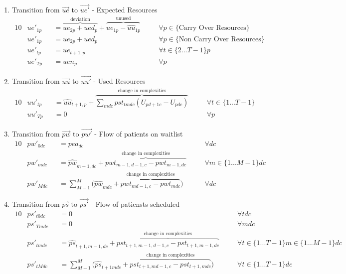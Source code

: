 \documentclass{article}
\begin{document}
\begin{enumerate}
	\item Transition from $\vec{ue}$ to $\vec{ue'}$ - Expected Resources
	\begin{alignat}{10}
		& ue'_{1p} 
			&& 	= \overbrace{ ue_{2p} + ued_{p} }^\text{deviation}
				+ \overbrace{ ue_{1p} - \hat{uu}_{1p} }^\text{unused} \quad
			&& \forall p \in \{ \text{Carry Over Resources} \} \\
		& ue'_{1p} 
			&& 	= ue_{2p} + ued_{p} \quad
			&& \forall p \in \{ \text{Non Carry Over Resources} \} \\
		& ue'_{tp} 
			&& = ue_{t+1,p} \quad 
			&& \forall t \in \{2...T-1\} p \\
		& ue'_{Tp} 
			&& = uen_{p} \quad
			&& \forall p
	\end{alignat} 
	
	\item Transition from $\vec{uu}$ to $\vec{uu'}$ - Used Resources	
	\begin{alignat}{10}
		& uu'_{tp}
			&& = \hat{uu}_{t+1,p} + 
				\overbrace{ \sum_{mdc} pst_{tmdc} (U_{pd+1c} - U_{pdc}) }^\text{
					change in complexities} \quad
			&& \forall t \in \{1...T-1\} \\
		& uu'_{Tp}
			&& = 0 \quad
			&& \forall p
	\end{alignat}	
	
	\item Transition from $\vec{pw}$ to $\vec{pw'}$ - Flow of patients on waitlist
		\begin{alignat}{10}
			& pw'_{0dc} 
				&& = pea_{dc} \quad
				&& \forall dc \\  
			& pw'_{mdc} 
				&& = \hat{pw}_{m-1,dc} + 
				\overbrace{pwt_{m-1,d-1,c} - pwt_{m-1,dc}}^\text{
					change in complexities} \quad
				&& \forall m \in \{ 1...M-1 \} dc \\  
			& pw'_{Mdc} 
				&& = \sum_{M-1}^{M} \big( 
					\hat{pw}_{mdc} + 
					\overbrace{pwt_{md-1,c} - pwt_{mdc}}^\text{
						change in complexities} \big) \quad
				&& \forall dc
		\end{alignat}


	\item Transition from $\vec{ps}$ to $\vec{ps'}$ - Flow of patiensts scheduled
		\begin{alignat}{10}
			& ps'_{t0dc} 
				&& = 0 \quad
				&& \forall tdc \\  
			& ps'_{Tmdc} 
				&& = 0 \quad
				&& \forall mdc \\  
			& ps'_{tmdc} 
				&& = \hat{ps}_{t+1,m-1,dc} + 
				\overbrace{pst_{t+1,m-1,d-1,c} - pst_{t+1,m-1,dc}}^\text{
					change in complexities} \quad
				&& \forall t \in \{1...T-1\} m \in \{ 1...M-1 \} dc \\  
			& ps'_{tMdc} 
				&& = \sum_{M-1}^{M} \big( 
				\hat{ps}_{t+1mdc} + 
				\overbrace{pst_{t+1,md-1,c} - pst_{t+1,mdc}}^\text{
					change in complexities} \big) \quad
				&& \forall t \in \{1...T-1\} dc
		\end{alignat}
\end{enumerate}
    
\end{document}
